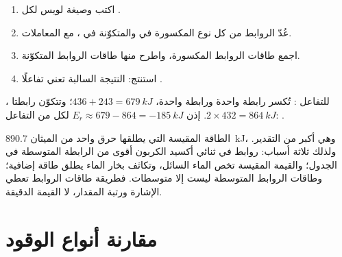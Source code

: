 \begin{method}\label{met:g11:reaction-energy:bonds}
\begin{enumerate}
  \item اكتب  وصيغة لويس لكل
        .
  \item عُدّ الروابط من كل نوع المكسورة في  والمتكوّنة
        في ، مع المعاملات.
  \item اجمع طاقات الروابط المكسورة، واطرح منها طاقات
        الروابط المتكوّنة.
  \item استنتج: النتيجة السالبة تعني تفاعلًا .
\end{enumerate}
\end{method}

\begin{example}\label{ex:g11:reaction-energy:hcl}
للتفاعل : تُكسر رابطة  واحدة ورابطة  واحدة،
$436 + 243 = \qty{679}{kJ}$؛ وتتكوّن رابطتا ، $2 \times 432 =
\qty{864}{kJ}$. إذن $E_r \approx 679 - 864 = \qty{-185}{kJ}$ لكل  من
التفاعل: .
\end{example}


\begin{remark}\label{rem:g11:reaction-energy:compare}
الطاقة المقيسة التي يطلقها حرق  واحد من الميثان
\qty{890.7}{kJ}، وهي أكبر من التقدير. ولذلك ثلاثة أسباب: روابط 
في ثنائي أكسيد الكربون أقوى من الرابطة  المتوسطة في
الجدول؛ والقيمة المقيسة تخص الماء السائل، وتكاثف بخار
الماء يطلق طاقة إضافية؛ وطاقات الروابط المتوسطة ليست إلا
متوسطات. فطريقة طاقات الروابط تعطي الإشارة ورتبة
المقدار، لا القيمة الدقيقة.
\end{remark}

\section{مقارنة أنواع الوقود}

